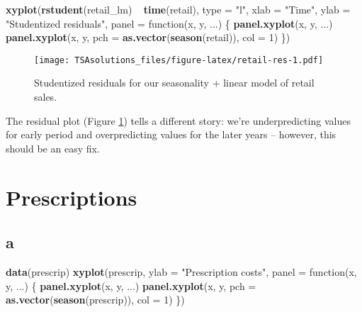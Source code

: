 \documentclass[]{book}
\newenvironment{Shaded}{\begin{snugshade}}{\end{snugshade}}
\newcommand{\KeywordTok}[1]{\textcolor[rgb]{0.13,0.29,0.53}{\textbf{{#1}}}}
\newcommand{\DataTypeTok}[1]{\textcolor[rgb]{0.13,0.29,0.53}{{#1}}}
\newcommand{\DecValTok}[1]{\textcolor[rgb]{0.00,0.00,0.81}{{#1}}}
\newcommand{\StringTok}[1]{\textcolor[rgb]{0.31,0.60,0.02}{{#1}}}
\newcommand{\NormalTok}[1]{{#1}}
\theoremstyle{definition}
\theoremstyle{definition}
\theoremstyle{remark}
\begin{document}
\begin{Shaded}
\begin{Highlighting}[]
\KeywordTok{xyplot}\NormalTok{(}\KeywordTok{rstudent}\NormalTok{(retail_lm) ~}\StringTok{ }\KeywordTok{time}\NormalTok{(retail), }\DataTypeTok{type =} \StringTok{"l"}\NormalTok{,}
       \DataTypeTok{xlab =} \StringTok{"Time"}\NormalTok{, }\DataTypeTok{ylab =} \StringTok{"Studentized residuals"}\NormalTok{,}
       \DataTypeTok{panel =} \NormalTok{function(x, y, ...) \{}
         \KeywordTok{panel.xyplot}\NormalTok{(x, y, ...)}
         \KeywordTok{panel.xyplot}\NormalTok{(x, y, }\DataTypeTok{pch =} \KeywordTok{as.vector}\NormalTok{(}\KeywordTok{season}\NormalTok{(retail)), }\DataTypeTok{col =} \DecValTok{1}\NormalTok{)}
       \NormalTok{\})}
\end{Highlighting}
\end{Shaded}

\begin{figure}[htbp]
\centering
\texttt{[image: TSAsolutions\_files/figure-latex/retail-res-1.pdf]}
\caption{\label{fig:retail-res}Studentized residuals for our seasonality +
linear model of retail sales.}
\end{figure}

The residual plot (Figure \ref{fig:retail-res}) tells a different story:
we're underpredicting values for early period and overpredicting values
for the later years -- however, this should be an easy fix.

\section{Prescriptions}\label{prescriptions}

\subsection*{a}\label{a-26}

\begin{Shaded}
\begin{Highlighting}[]
\KeywordTok{data}\NormalTok{(prescrip)}
\KeywordTok{xyplot}\NormalTok{(prescrip, }\DataTypeTok{ylab =} \StringTok{"Prescription costs"}\NormalTok{,}
       \DataTypeTok{panel =} \NormalTok{function(x, y, ...) \{}
         \KeywordTok{panel.xyplot}\NormalTok{(x, y, ...)}
         \KeywordTok{panel.xyplot}\NormalTok{(x, y, }\DataTypeTok{pch =} \KeywordTok{as.vector}\NormalTok{(}\KeywordTok{season}\NormalTok{(prescrip)), }\DataTypeTok{col =} \DecValTok{1}\NormalTok{)}
       \NormalTok{\})}
\end{Highlighting}
\end{Shaded}
\end{document}
